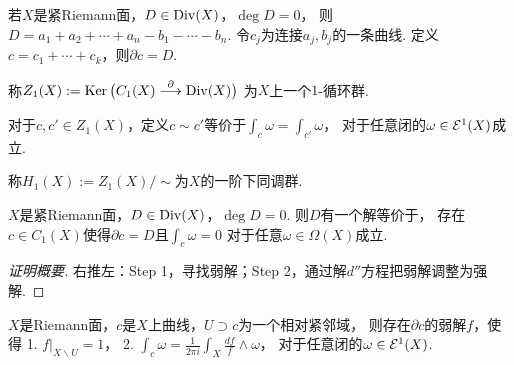 若$X$是紧Riemann面，$D\in \operatorname{Div}(X)$，$\deg D=0$，
则$D=a_1+a_2+\cdots+a_n-b_1-\cdots-b_n$. 
令$c_j$为连接$a_j,b_j$的一条曲线. 定义$c=c_1+\cdots+c_k$，则$\partial c=D$.

\begin{definition}
	称$Z_1(X):=\operatorname{Ker} \big(C_1(X) \stackrel{\partial}{\longrightarrow} \operatorname{Div}(X)\big)$
    为$X$上一个$1$-循环群.

	对于$c,c'\in Z_1(X)$，定义$c\sim c'$等价于$\int_c \omega=\int_{c'}\omega$，
    对于任意闭的$\omega\in \mathcal{E}^1(X)$成立.

	称$H_1(X):=Z_1(X)/\sim$为$X$的一阶下同调群.
\end{definition}
		
\begin{theorem}[Abel定理]
	$X$是紧Riemann面，$D\in \operatorname{Div}(X)$，$\deg D=0$. 则$D$有一个解等价于，
    存在$c\in C_1(X)$使得$\partial c=D$且$\int_c\omega=0$
    对于任意$\omega\in \Omega(X)$成立.
\end{theorem}

\begin{proof}[证明概要]
	右推左：Step 1，寻找弱解；Step 2，通过解$d''$方程把弱解调整为强解.
\end{proof}
		
\begin{lemma}\label{weaksolution}
    $X$是Riemann面，$c$是$X$上曲线，$U\supset c$为一个相对紧邻域，
    则存在$\partial c$的弱解$f$，使得
	1. $f|_{X\backslash U}=1$，
    2. $\int_c \omega = \frac{1}{2\pi i} \int_X \frac{df}{f}\wedge \omega$，
    对于任意闭的$\omega\in \mathcal{E}^1(X)$.
\end{lemma}

